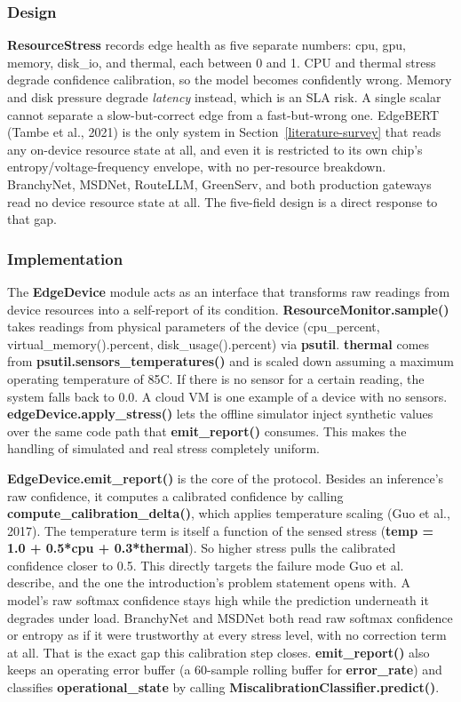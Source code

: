 \hypertarget{design}{%
\subsubsection{Design}\label{design}}

\textbf{ResourceStress} records edge health as five separate numbers:
cpu, gpu, memory, disk\_io, and thermal, each between 0 and 1. CPU and thermal stress degrade confidence
calibration, so the model becomes confidently wrong. Memory and disk
pressure degrade \emph{latency} instead, which is an SLA risk. A single
scalar cannot separate a slow-but-correct edge from a fast-but-wrong
one. EdgeBERT (Tambe et al., 2021) is the only system in Section~\ref{literature-survey} that
reads any on-device resource state at all, and even it is restricted to
its own chip's entropy/voltage-frequency envelope, with no per-resource
breakdown. BranchyNet, MSDNet, RouteLLM, GreenServ, and both production
gateways read no device resource state at all. The five-field design is
a direct response to that gap.

\hypertarget{implementation}{%
\subsubsection{Implementation}\label{implementation}}

The \textbf{EdgeDevice} module acts as an interface that transforms raw
readings from device resources into a self-report of its condition.
\textbf{ResourceMonitor.sample()} takes readings from physical
parameters of the device (cpu\_percent, virtual\_memory().percent,
disk\_usage().percent) via \textbf{psutil}. \textbf{thermal} comes from
\textbf{psutil.sensors\_temperatures()} and is scaled down assuming a maximum
operating temperature of 85\textdegree{}C. If there is no sensor for a certain reading, the system falls back to
0.0. A cloud VM is one example of a device with no sensors.
\textbf{edgeDevice.apply\_stress()} lets the offline simulator inject
synthetic values over the same code path that \textbf{emit\_report()}
consumes. This makes the handling of simulated and real stress
completely uniform.

\textbf{EdgeDevice.emit\_report()} is the core of the protocol. Besides
an inference's raw confidence, it computes a calibrated confidence by
calling \textbf{compute\_calibration\_delta()}, which applies
temperature scaling (Guo et al., 2017). The temperature term is itself
a function of the sensed stress (\textbf{temp = 1.0 + 0.5*cpu + 0.3*thermal}).
So higher stress pulls the calibrated confidence closer to 0.5. This
directly targets the failure mode Guo et al. describe, and the one the
introduction's problem statement opens with. A model's raw softmax
confidence stays high while the prediction underneath it degrades under
load. BranchyNet and MSDNet both read raw softmax confidence or entropy
as if it were trustworthy at every stress level, with no correction
term at all. That is the exact gap this calibration step closes.
\textbf{emit\_report()} also keeps an operating error buffer (a
60-sample rolling buffer for \textbf{error\_rate}) and classifies
\textbf{operational\_state} by calling
\textbf{MiscalibrationClassifier.predict()}.

